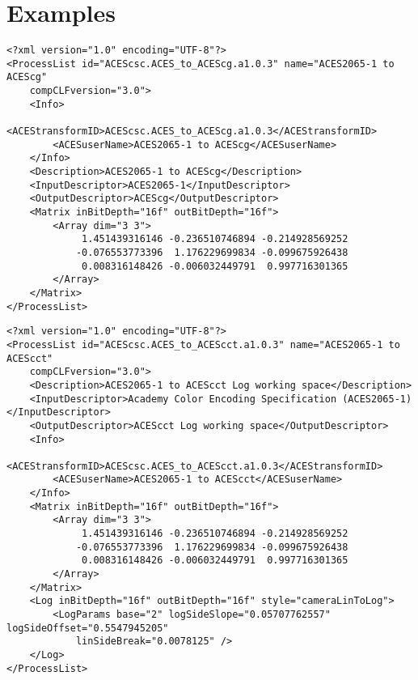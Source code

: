 \regularsectionformat
\chapter{Examples}
\label{sec:examples}

\begin{lstlisting}[caption=ACES2065-1 to ACEScg]
<?xml version="1.0" encoding="UTF-8"?>
<ProcessList id="ACEScsc.ACES_to_ACEScg.a1.0.3" name="ACES2065-1 to ACEScg" 
    compCLFversion="3.0">
    <Info>
        <ACEStransformID>ACEScsc.ACES_to_ACEScg.a1.0.3</ACEStransformID>
        <ACESuserName>ACES2065-1 to ACEScg</ACESuserName>
    </Info>
    <Description>ACES2065-1 to ACEScg</Description>
    <InputDescriptor>ACES2065-1</InputDescriptor>
    <OutputDescriptor>ACEScg</OutputDescriptor>
    <Matrix inBitDepth="16f" outBitDepth="16f">
        <Array dim="3 3">
             1.451439316146 -0.236510746894 -0.214928569252
            -0.076553773396  1.176229699834 -0.099675926438
             0.008316148426 -0.006032449791  0.997716301365
        </Array>
    </Matrix>
</ProcessList>
\end{lstlisting}

\begin{lstlisting}[caption=ACES2065-1 to ACEScct]
<?xml version="1.0" encoding="UTF-8"?>
<ProcessList id="ACEScsc.ACES_to_ACEScct.a1.0.3" name="ACES2065-1 to ACEScct" 
    compCLFversion="3.0">
    <Description>ACES2065-1 to ACEScct Log working space</Description>
    <InputDescriptor>Academy Color Encoding Specification (ACES2065-1)</InputDescriptor>
    <OutputDescriptor>ACEScct Log working space</OutputDescriptor>
    <Info>
        <ACEStransformID>ACEScsc.ACES_to_ACEScct.a1.0.3</ACEStransformID>
        <ACESuserName>ACES2065-1 to ACEScct</ACESuserName>
    </Info>
    <Matrix inBitDepth="16f" outBitDepth="16f">
        <Array dim="3 3">
             1.451439316146 -0.236510746894 -0.214928569252
            -0.076553773396  1.176229699834 -0.099675926438
             0.008316148426 -0.006032449791  0.997716301365
        </Array>
    </Matrix>
    <Log inBitDepth="16f" outBitDepth="16f" style="cameraLinToLog">
        <LogParams base="2" logSideSlope="0.05707762557" logSideOffset="0.5547945205" 
            linSideBreak="0.0078125" />
    </Log>
</ProcessList>
\end{lstlisting}

